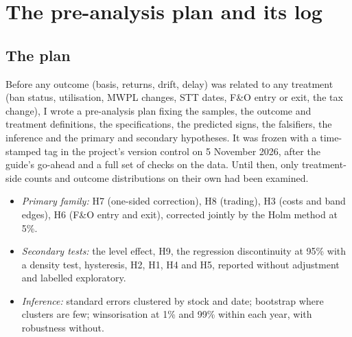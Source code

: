 \chapter{The pre-analysis plan and its log}\label{app:plan}

\section{The plan}
Before any outcome (basis, returns, drift, delay) was related to any treatment (ban status, utilisation, MWPL changes, STT
dates, F\&O entry or exit, the tax change), I wrote a pre-analysis plan fixing the samples, the outcome and treatment
definitions, the specifications, the predicted signs, the falsifiers, the inference and the primary and secondary
hypotheses. It was frozen with a time-stamped tag in the project's version control on 5 November 2026, after the guide's
go-ahead and a full set of checks on the data. Until then, only treatment-side counts and outcome distributions on their own had
been examined.

\begin{itemize}
\item \emph{Primary family:} H7 (one-sided correction), H8 (trading), H3 (costs and band edges), H6 (F\&O entry and exit),
corrected jointly by the Holm method at 5\%.
\item \emph{Secondary tests:} the level effect, H9, the regression discontinuity at 95\% with a density test, hysteresis,
H2, H1, H4 and H5, reported without adjustment and labelled exploratory.
\item \emph{Inference:} standard errors clustered by stock and date; bootstrap where clusters are few; winsorisation at 1\%
and 99\% within each year, with robustness without.
\end{itemize}

